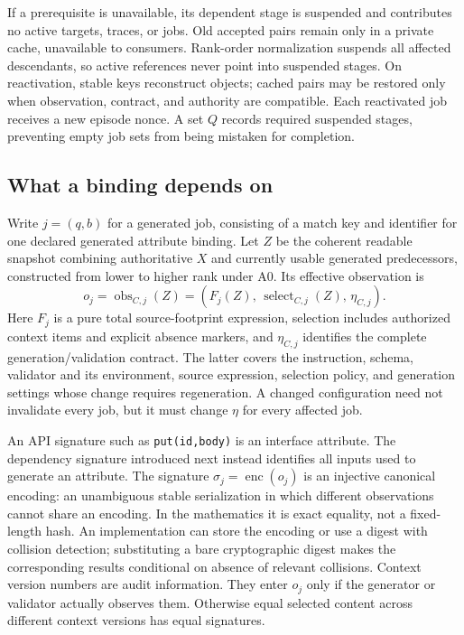 \documentclass[pdflatex,sn-mathphys-num]{sn-jnl}
\theoremstyle{thmstyleone}
\theoremstyle{thmstylethree}
\theoremstyle{thmstyletwo}
\newcommand{\Sig}{\sigma}
\newcommand{\obs}{\operatorname{obs}}
\begin{document}
If a prerequisite is unavailable, its dependent stage is suspended and contributes no active targets, traces, or jobs. Old accepted pairs remain only in a private cache, unavailable to consumers. Rank-order normalization suspends all affected descendants, so active references never point into suspended stages. On reactivation, stable keys reconstruct objects; cached pairs may be restored only when observation, contract, and authority are compatible. Each reactivated job receives a new episode nonce. A set $Q$ records required suspended stages, preventing empty job sets from being mistaken for completion.

\subsection{What a binding depends on}
Write $j=(q,b)$ for a generated job, consisting of a match key and identifier for one declared generated attribute binding. Let $Z$ be the coherent readable snapshot combining authoritative $X$ and currently usable generated predecessors, constructed from lower to higher rank under A0. Its effective observation is
\begin{equation}\label{eq:obs}
o_j=\obs_{C,j}(Z)=(F_j(Z),\,\operatorname{select}_{C,j}(Z),\,\eta_{C,j}).
\end{equation}
Here $F_j$ is a pure total source-footprint expression, selection includes authorized context items and explicit absence markers, and $\eta_{C,j}$ identifies the complete generation/validation contract. The latter covers the instruction, schema, validator and its environment, source expression, selection policy, and generation settings whose change requires regeneration. A changed configuration need not invalidate every job, but it must change $\eta$ for every affected job.

An API signature such as \texttt{put(id,body)} is an interface attribute. The dependency signature introduced next instead identifies all inputs used to generate an attribute. The signature $\Sig_j=\operatorname{enc}(o_j)$ is an injective canonical encoding: an unambiguous stable serialization in which different observations cannot share an encoding. In the mathematics it is exact equality, not a fixed-length hash. An implementation can store the encoding or use a digest with collision detection; substituting a bare cryptographic digest makes the corresponding results conditional on absence of relevant collisions. Context version numbers are audit information. They enter $o_j$ only if the generator or validator actually observes them. Otherwise equal selected content across different context versions has equal signatures.
\end{document}

